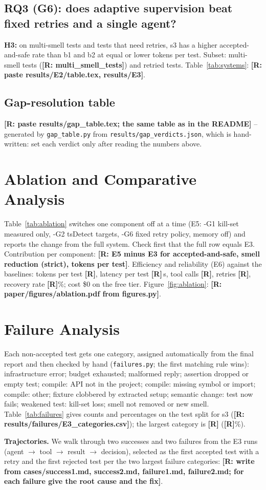 \subsection{RQ3 (G6): does adaptive supervision beat fixed retries and a single agent?}
\textbf{H3:} on multi-smell tests and tests that need retries, \textsf{s3} has a higher accepted-and-safe rate than \textsf{b1} and \textsf{b2} at equal or lower tokens per test.
Subset: multi-smell tests (\textbf{[R: multi\_smell\_tests]}) and retried tests. Table~\ref{tab:systems}: \textbf{[R: paste results/E2/table.tex, results/E3]}.

\subsection{Gap-resolution table}
\textbf{[R: paste results/gap\_table.tex; the same table as in the README]} -- generated by \texttt{gap\_table.py} from \texttt{results/gap\_verdicts.json}, which is hand-written: set each verdict only after reading the numbers above.

\section{Ablation and Comparative Analysis}\label{sec:ablation}
Table~\ref{tab:ablation} switches one component off at a time (E5: \textsf{-G1} kill-set measured only, \textsf{-G2} tsDetect targets, \textsf{-G6} fixed retry policy, memory off) and reports the change from the full system.
Check first that the full row equals E3. Contribution per component: \textbf{[R: E5 minus E3 for accepted-and-safe, smell reduction (strict), tokens per test]}.
Efficiency and reliability (E6) against the baselines: tokens per test \textbf{[R]}, latency per test \textbf{[R]}\,s, tool calls \textbf{[R]}, retries \textbf{[R]}, recovery rate \textbf{[R]}\%; cost \$0 on the free tier.
Figure~\ref{fig:ablation}: \textbf{[R: paper/figures/ablation.pdf from figures.py]}.

\section{Failure Analysis}\label{sec:failures}
Each non-accepted test gets one category, assigned automatically from the final report and then checked by hand (\texttt{failures.py}; the first matching rule wins):
infrastructure error; budget exhausted; malformed reply; assertion dropped or empty test; compile: API not in the project; compile: missing symbol or import; compile: other;
fixture clobbered by extracted setup; semantic change: test now fails; weakened test: kill-set loss; smell not removed or new smell.
Table~\ref{tab:failures} gives counts and percentages on the test split for \textsf{s3} (\textbf{[R: results/failures/E3\_categories.csv]}); the largest category is \textbf{[R]} (\textbf{[R]}\%).

\textbf{Trajectories.} We walk through two successes and two failures from the E3 runs (agent $\to$ tool $\to$ result $\to$ decision), selected as the first accepted test with a retry and the first rejected test per the two largest failure categories:
\textbf{[R: write from cases/success1.md, success2.md, failure1.md, failure2.md; for each failure give the root cause and the fix]}.
